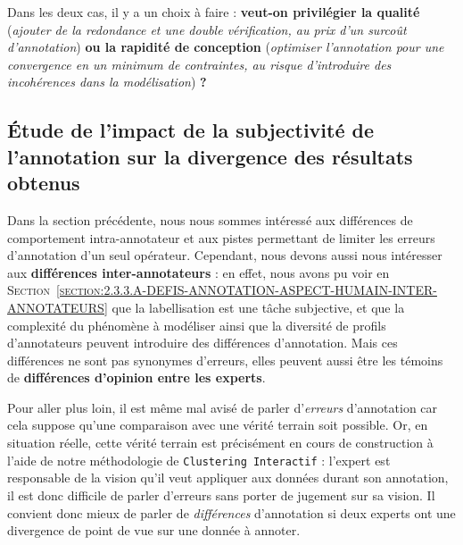 			\begin{leftBarAuthorOpinion}
				Dans les deux cas, il y a un choix à faire : \textbf{veut-on privilégier la qualité} (\textit{ajouter de la redondance et une double vérification, au prix d'un surcoût d'annotation}) \textbf{ou la rapidité de conception} (\textit{optimiser l'annotation pour une convergence en un minimum de contraintes, au risque d'introduire des incohérences dans la modélisation}) \textbf{?}
			\end{leftBarAuthorOpinion}
	
	
	\subsection{Étude de l'impact de la subjectivité de l'annotation sur la divergence des résultats obtenus}
	\label{section:4.6.3-ETUDE-ROBUSTESSE-SUBJECTIVITE-ANNOTATION-ET-DIVERGENCE}
		
		Dans la section précédente, nous nous sommes intéressé aux différences de comportement intra-annotateur et aux pistes permettant de limiter les erreurs d'annotation d'un seul opérateur.
		Cependant, nous devons aussi nous intéresser aux \textbf{différences inter-annotateurs} :
		en effet, nous avons pu voir en \textsc{Section~\ref{section:2.3.3.A-DEFIS-ANNOTATION-ASPECT-HUMAIN-INTER-ANNOTATEURS}} que la labellisation est une tâche subjective, et que la complexité du phénomène à modéliser ainsi que la diversité de profils d'annotateurs peuvent introduire des différences d'annotation.
		Mais ces différences ne sont pas synonymes d'erreurs, elles peuvent aussi être les témoins de \textbf{différences d'opinion entre les experts}.
		\begin{leftBarAuthorOpinion}
			Pour aller plus loin, il est même mal avisé de parler d'\textit{erreurs} d'annotation car cela suppose qu'une comparaison avec une vérité terrain soit possible.
			Or, en situation réelle, cette vérité terrain est précisément en cours de construction à l'aide de notre méthodologie de \texttt{Clustering Interactif} : l'expert est responsable de la vision qu'il veut appliquer aux données durant son annotation, il est donc difficile de parler d'erreurs sans porter de jugement sur sa vision.
			Il convient donc mieux de parler de \textit{différences} d'annotation si deux experts ont une divergence de point de vue sur une donnée à annoter.
		\end{leftBarAuthorOpinion}
		
